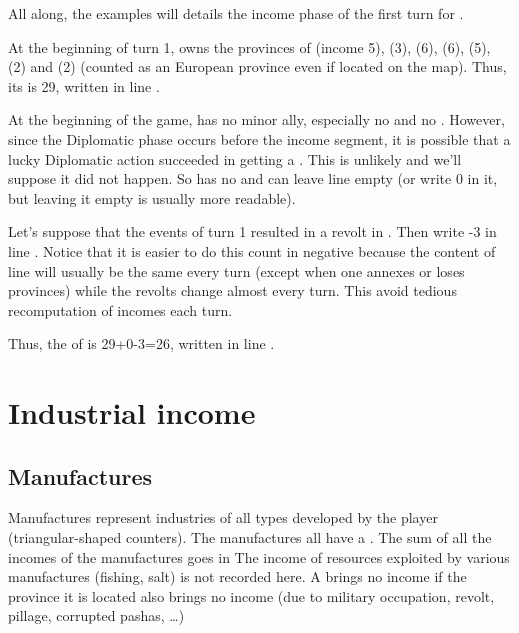 \begin{exemple}
  All along, the examples will details the income phase of the first
  turn for \POR.

  At the beginning of turn 1, \POR owns the provinces of
   (income 5), \provinceBeira (3),
  \provinceTejo (6), \provinceAlentejo (6), \provinceAlgarve (5),
  \provinceTanger (2) and \provinceAcores (2) (counted as an European
  province even if located on the \ROTW map). Thus, its  is 29\ducats, written in line .

  At the beginning of the game, \POR has no minor ally, especially no
  \VASSAL and no . However, since the
  Diplomatic phase occurs before the income segment, it is possible that
  a lucky Diplomatic action succeeded in getting \POR a \VASSAL. This is
  unlikely and we'll suppose it did not happen. So \POR has no
   and can leave line  empty (or write 0 in it, but leaving it empty is
  usually more readable).

  Let's suppose that the events of turn 1 resulted in a revolt in
  \provinceBeira. Then \POR write -3 in line . Notice that it is easier to do this count in
  negative because the content of line 
  will usually be the same every turn (except when one annexes or loses
  provinces) while the revolts change almost every turn. This avoid
  tedious recomputation of incomes each turn.

  Thus, the  of \POR is 29+0-3=26\ducats, written in
  line .
\end{exemple}


\section{Industrial income}\label{chIncomes:IndustrialIncome}
\subsection{Manufactures}\label{chIncomes:Manufactures}
\aparag Manufactures represent industries of all types developed by the
player (triangular-shaped counters).
\aparag The manufactures all have a .
\bparag The sum of all the incomes of the manufactures goes in
\bparag The income of resources exploited by various manufactures
(fishing, salt) is not recorded here.
\bparag A \MNU brings no income if the province it is located also
brings no income (due to military occupation, revolt, pillage,
corrupted pashas, \ldots)

